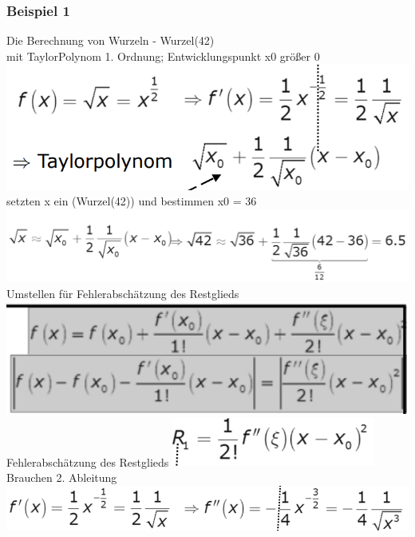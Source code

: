 \documentclass[12pt,a4paper]{article}
\begin{document}
\subsubsection{Beispiel 1}
Die Berechnung von Wurzeln - Wurzel(42)\\
mit TaylorPolynom 1. Ordnung; Entwicklungspunkt x0 größer 0\\
\includegraphics[width=1\textwidth]{Bilder/V1/10.png}\\
setzten x ein (Wurzel(42)) und bestimmen x0 = 36\\
\includegraphics[width=1\textwidth]{Bilder/V1/11.png}\\
Umstellen für Fehlerabschätzung des Restglieds\\
\includegraphics[width=1\textwidth]{Bilder/V1/12.png}\\
Fehlerabschätzung des Restglieds 
\includegraphics[width=0.5\textwidth]{Bilder/V1/13.png}\\
Brauchen 2. Ableitung\\
\includegraphics[width=1\textwidth]{Bilder/V1/14.png}\\
\end{document}
